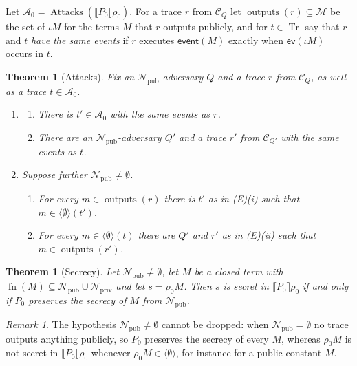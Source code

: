 \documentclass[11pt]{article}
\theoremstyle{definition}
\theoremstyle{plain}
\newtheorem{theorem}[definition]{Theorem}
\theoremstyle{remark}
\newtheorem{remark}[definition]{Remark}
\newcommand{\outputs}{\operatorname{outputs}}
\newcommand{\Attacks}{\operatorname{Attacks}}
\newcommand{\sem}[1]{\llbracket #1 \rrbracket}
\newcommand{\fn}{\operatorname{fn}}
\newcommand{\Tr}{\operatorname{Tr}}
\begin{document}
Let $\mathcal{A}_0=\Attacks(\sem{P_0}\rho_0)$. For a trace $r$ from $\mathcal{C}_Q$ let $\outputs(r)\subseteq\mathcal{M}$ be the set of $\iota M$ for the terms $M$ that $r$ outputs publicly, and for $t\in\Tr$ say that $r$ and $t$ \textit{have the same events} if $r$ executes $\mathsf{event}(M)$ exactly when $\mathsf{ev}(\iota M)$ occurs in $t$.

\begin{theorem}[Attacks]\label{thm:A}
Fix an $\mathcal{N}_{\mathrm{pub}}$-adversary $Q$ and a trace $r$ from $\mathcal{C}_Q$, as well as a trace $t\in\mathcal{A}_0$.
\begin{enumerate}
\item[(E)]
\begin{enumerate}
\item[(i)] There is $t'\in\mathcal{A}_0$ with the same events as $r$.
\item[(ii)] There are an $\mathcal{N}_{\mathrm{pub}}$-adversary $Q'$ and a trace $r'$ from $\mathcal{C}_{Q'}$ with the same events as $t$.
\end{enumerate}
\item[(K)] Suppose further $\mathcal{N}_{\mathrm{pub}}\ne\emptyset$.
\begin{enumerate}
\item[(i)] For every $m\in\outputs(r)$ there is $t'$ as in (E)(i) such that $m\in\langle\emptyset\rangle(t')$.
\item[(ii)] For every $m\in\langle\emptyset\rangle(t)$ there are $Q'$ and $r'$ as in (E)(ii) such that $m\in\outputs(r')$.
\end{enumerate}
\end{enumerate}
\end{theorem}

\begin{theorem}[Secrecy]\label{thm:secrecy}
Let $\mathcal{N}_{\mathrm{pub}}\ne\emptyset$, let $M$ be a closed term with $\fn(M)\subseteq\mathcal{N}_{\mathrm{pub}}\cup\mathcal{N}_{\mathrm{priv}}$ and let $s=\rho_0M$. Then $s$ is secret in $\sem{P_0}\rho_0$ if and only if $P_0$ preserves the secrecy of $M$ from $\mathcal{N}_{\mathrm{pub}}$.
\end{theorem}

\begin{remark}
The hypothesis $\mathcal{N}_{\mathrm{pub}}\ne\emptyset$ cannot be dropped: when $\mathcal{N}_{\mathrm{pub}}=\emptyset$ no trace outputs anything publicly, so $P_0$ preserves the secrecy of every $M$, whereas $\rho_0M$ is not secret in $\sem{P_0}\rho_0$ whenever $\rho_0M\in\langle\emptyset\rangle$, for instance for a public constant $M$.
\end{remark}
\end{document}
